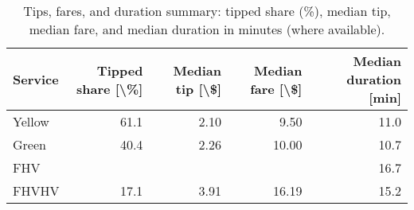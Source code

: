 \begin{table}
\caption{Tips, fares, and duration summary: tipped share (\%), median tip, median fare, and median duration in minutes (where available).}
\label{tab:t4_tips_fares_duration}
\begin{tabular}{lrrrr}
\toprule
Service & Tipped share [\textbackslash \%] & Median tip [\textbackslash \$] & Median fare [\textbackslash \$] & Median duration [min] \\
\midrule
Yellow & 61.1 & 2.10 & 9.50 & 11.0 \\
Green & 40.4 & 2.26 & 10.00 & 10.7 \\
FHV &  &  &  & 16.7 \\
FHVHV & 17.1 & 3.91 & 16.19 & 15.2 \\
\bottomrule
\end{tabular}
\end{table}
